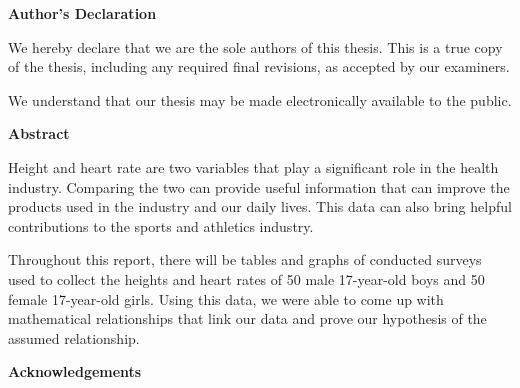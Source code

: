 \cleardoublepage %
 \begin{center}\textbf{Author's Declaration}\end{center}
  
 \noindent
We hereby declare that we are the sole authors of this thesis. This is a true copy of the thesis, including any required final revisions, as accepted by our examiners. 

  \bigskip
  
  \noindent
We understand that our thesis may be made electronically available to the public.

\cleardoublepage
{}    %

\begin{center}\textbf{Abstract}\end{center}

Height and heart rate are two variables that play a significant role in the health industry. Comparing the two can provide useful information that can improve the products used in the industry and our daily lives. This data can also bring helpful contributions to the sports and athletics industry.

Throughout this report, there will be tables and graphs of conducted surveys used to collect the heights and heart rates of 50 male 17-year-old boys and 50 female 17-year-old girls. Using this data, we were able to come up with mathematical relationships that link our data and prove our hypothesis of the assumed relationship.

\cleardoublepage
{}    %

\begin{center}\textbf{Acknowledgements}\end{center}

